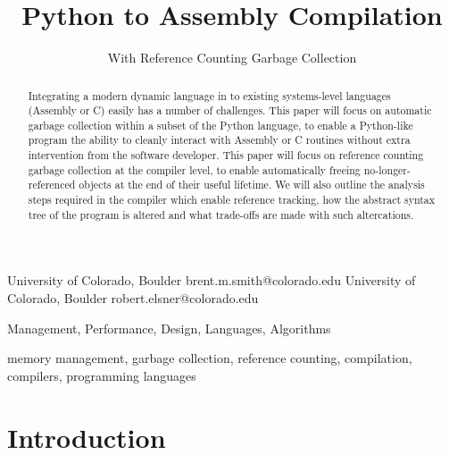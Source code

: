 \documentclass{sigplanconf}
\begin{document}
\copyrightdata{[to be supplied]} 


\title{Python to Assembly Compilation}
\subtitle{With Reference Counting Garbage Collection}

           {University of Colorado, Boulder}
           {brent.m.smith@colorado.edu}
           {University of Colorado, Boulder}
           {robert.elsner@colorado.edu}

\maketitle

\begin{abstract}
Integrating a modern dynamic language in to existing systems-level languages (Assembly or C) easily has a number of challenges.  This paper will focus on automatic garbage collection within a subset of the Python language, to enable a Python-like program the ability to cleanly interact with Assembly or C routines without extra intervention from the software developer.  This paper will focus on reference counting garbage collection at the compiler level, to enable automatically freeing no-longer-referenced objects at the end of their useful lifetime.  We will also outline the analysis steps required in the compiler which enable reference tracking, how the abstract syntax tree of the program is altered and what trade-offs are made with such altercations.
\end{abstract}


\terms
Management, Performance, Design, Languages, Algorithms

\keywords
memory management, garbage collection, reference counting, compilation, compilers, programming languages

\section{Introduction}
\end{document}
